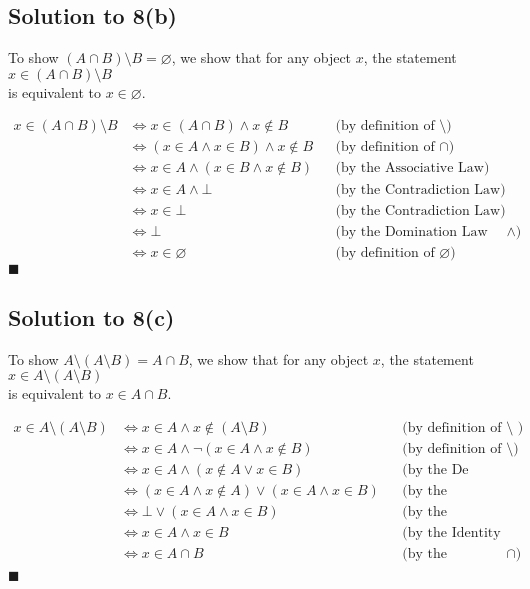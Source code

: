 \documentclass{scrartcl}
\begin{document}
    \subsection*{Solution to 8(b)}
    To show $(A \cap B) \setminus B = \varnothing$, we show that for any object $x$, the statement $x \in (A \cap B) \setminus B$ \\ 
    is equivalent to $x \in \varnothing$.

    \begin{align*}
        x \in (A \cap B) \setminus B
        &\Leftrightarrow x \in (A \cap B) \wedge x \notin B
        && \text{(by definition of $\setminus$)} \\
        &\Leftrightarrow (x \in A \wedge x \in B) \wedge x \notin B
        && \text{(by definition of $\cap$)} \\
        &\Leftrightarrow x \in A \wedge (x \in B \wedge x \notin B)
        && \text{(by the Associative Law)} \\
        &\Leftrightarrow x \in A \wedge \bot
        && \text{(by the Contradiction Law)} \\
        &\Leftrightarrow x \in \bot
        && \text{(by the Contradiction Law)} \\
        &\Leftrightarrow \bot
        && \text{(by the Domination Law for $\wedge$)} \\
        &\Leftrightarrow x \in \varnothing
        && \text{(by definition of $\varnothing$)}
    \end{align*}
    \hfill $\blacksquare$


    \subsection*{Solution to 8(c)}
        To show $A \setminus (A \setminus B) = A \cap B$, we show that for any object $x$, the statement $x \in A \setminus (A \setminus B)$ \\ 
        is equivalent to $x \in A \cap B$.

    \begin{align*}
        x \in A \setminus (A \setminus B) 
        &\Leftrightarrow x \in A \wedge x \notin (A \setminus B)
        && \text{(by definition of $\setminus$  )} \\
        &\Leftrightarrow x \in A \wedge \neg (x \in A \wedge x \notin B)
        && \text{(by definition of $\setminus$)} \\
        &\Leftrightarrow x \in A \wedge (x \notin A \vee x \in B)
        && \text{(by the De Morgan Law)} \\
        &\Leftrightarrow (x \in A \wedge x \notin A) \vee (x \in A \wedge x \in B)
        && \text{(by the Distributive Law)} \\
        &\Leftrightarrow \bot \vee (x \in A \wedge x \in B)
        && \text{(by the Contradiction Law)} \\
        &\Leftrightarrow x \in A \wedge x \in B
        && \text{(by the Identity Law)} \\
        &\Leftrightarrow x \in A \cap B
        && \text{(by the definition of $\cap$)} \\
    \end{align*}
    \hfill $\blacksquare$
    \newpage
\end{document}
